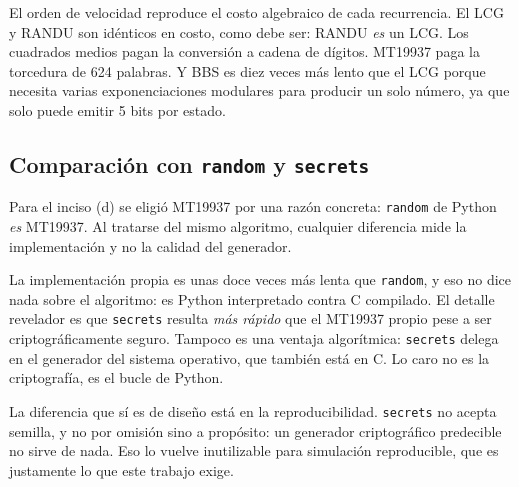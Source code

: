 El orden de velocidad reproduce el costo algebraico de cada recurrencia. El LCG
y RANDU son idénticos en costo, como debe ser: RANDU \emph{es} un LCG. Los
cuadrados medios pagan la conversión a cadena de dígitos. MT19937 paga la
torcedura de 624 palabras. Y BBS es diez veces más lento que el LCG porque
necesita varias exponenciaciones modulares para producir un solo número, ya que
solo puede emitir 5 bits por estado.

\subsection{Comparación con \texttt{random} y \texttt{secrets}}
\label{sec:librerias}

Para el inciso (d) se eligió MT19937 por una razón concreta: \texttt{random} de
Python \emph{es} MT19937. Al tratarse del mismo algoritmo, cualquier diferencia
mide la implementación y no la calidad del generador.

\begin{table}[H]
\centering\small

\caption{Comparación del MT19937 propio contra las librerías estándar.}
\label{tab:librerias}
\end{table}

La implementación propia es unas doce veces más lenta que \texttt{random}, y
eso no dice nada sobre el algoritmo: es Python interpretado contra C compilado.
El detalle revelador es que \texttt{secrets} resulta \emph{más rápido} que el
MT19937 propio pese a ser criptográficamente seguro. Tampoco es una ventaja
algorítmica: \texttt{secrets} delega en el generador del sistema operativo, que
también está en C. Lo caro no es la criptografía, es el bucle de Python.

La diferencia que sí es de diseño está en la reproducibilidad.
\texttt{secrets} no acepta semilla, y no por omisión sino a propósito: un
generador criptográfico predecible no sirve de nada. Eso lo vuelve inutilizable
para simulación reproducible, que es justamente lo que este trabajo exige.
